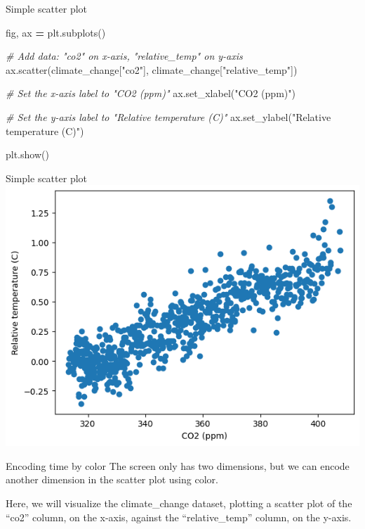 \documentclass[
  ignorenonframetext,
]{beamer}
\newenvironment{Shaded}{\begin{snugshade}}{\end{snugshade}}
\newcommand{\CommentTok}[1]{\textcolor[rgb]{0.56,0.35,0.01}{\textit{#1}}}
\newcommand{\NormalTok}[1]{#1}
\newcommand{\OperatorTok}[1]{\textcolor[rgb]{0.81,0.36,0.00}{\textbf{#1}}}
\newcommand{\StringTok}[1]{\textcolor[rgb]{0.31,0.60,0.02}{#1}}
\begin{document}
\begin{frame}[fragile]{Simple scatter plot}
\label{simple-scatter-plot-2}

\begin{Shaded}
\begin{Highlighting}[]
\NormalTok{fig, ax }\OperatorTok{=}\NormalTok{ plt.subplots()}

\CommentTok{\# Add data: "co2" on x{-}axis, "relative\_temp" on y{-}axis}
\NormalTok{ax.scatter(climate\_change[}\StringTok{"co2"}\NormalTok{], climate\_change[}\StringTok{"relative\_temp"}\NormalTok{])}

\CommentTok{\# Set the x{-}axis label to "CO2 (ppm)"}
\NormalTok{ax.set\_xlabel(}\StringTok{"CO2 (ppm)"}\NormalTok{)}

\CommentTok{\# Set the y{-}axis label to "Relative temperature (C)"}
\NormalTok{ax.set\_ylabel(}\StringTok{"Relative temperature (C)"}\NormalTok{)}

\NormalTok{plt.show()}
\end{Highlighting}
\end{Shaded}
\end{frame}

\begin{frame}{Simple scatter plot}
\label{simple-scatter-plot-3}
\includegraphics{../images/im247.png}
\end{frame}

\begin{frame}{Encoding time by color}
\label{encoding-time-by-color}
The screen only has two dimensions, but we can encode another dimension
in the scatter plot using color.

Here, we will visualize the climate\_change dataset, plotting a scatter
plot of the ``co2'' column, on the x-axis, against the
``relative\_temp'' column, on the y-axis.
\end{frame}
\end{document}
